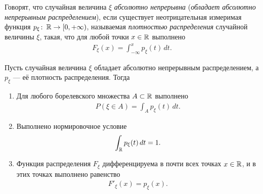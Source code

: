 \documentclass[../main.tex]{subfiles}
\begin{document}
\begin{df}
 Говорят, что  случайная величина $\xi$ \textit{абсолютно непрерывна} (\textit{обладает абсолютно непрерывным распределением}), если существует неотрицательная измеримая функция $p_{\xi} \colon\, \mathbb{R} \to [0, +\infty)$, называемая \textit{плотностью распределения} случайной величины $ \xi $,  такая, что для любой точки $ x \in \mathbb{R} $ выполнено
 \begin{align}
  \label{equation:density_def}
  F_{\xi}(x) = \int_{-\infty}^{x} p_{\xi}(t)\,dt
 .\end{align}
\end{df}
\begin{prop}
 Пусть случайная величина $ \xi $ обладает абсолютно непрерывным распределением, а $ p_{\xi} $ --- её плотность распределения. Тогда
 \begin{enumerate}
  \item Для любого борелевского множества $ A \subset \mathbb{R} $ выполнено
   \begin{align}
    \label{equation:value_of_absolute_continous_distribution}
    P(\xi \in A) = \int_{A} p_{\xi} (t) \, dt.
   \end{align} 
  \item Выполнено нормировочное условие
   \begin{align*}
    \int_{\mathbb{R}} p_{\xi}(t)\,dt = 1.
   \end{align*}
  \item Функция распределения $ F_\xi $ дифференцируема в почти всех точках $ x \in \mathbb{R} $, и в этих точках выполнено равенство
   \begin{align*}
    F'_{\xi}(x) = p_{\xi}(x).
   \end{align*}
 \end{enumerate}
\end{prop}
\end{document}
